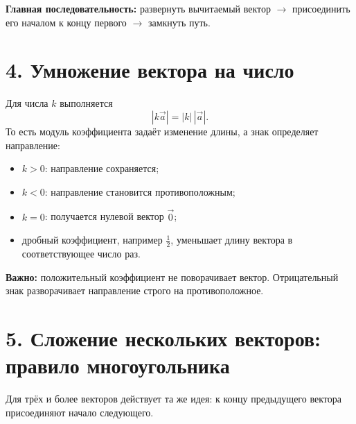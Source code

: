 \documentclass[a4paper,12pt]{article}
\newcommand{\key}[1]{\textbf{\color{darkaccent}#1}}
\newcommand{\mistake}[1]{\textbf{\color{warn}#1}}
\begin{document}
\key{Главная последовательность:} развернуть вычитаемый вектор $\to$ присоединить его началом к концу первого $\to$ замкнуть путь.

\clearpage
\section*{4. Умножение вектора на число}
Для числа $k$ выполняется
\[
|k\vec a|=|k|\,|\vec a|.
\]
То есть модуль коэффициента задаёт изменение длины, а знак определяет направление:

\begin{itemize}
  \item $k>0$: направление сохраняется;
  \item $k<0$: направление становится противоположным;
  \item $k=0$: получается нулевой вектор $\vec 0$;
  \item дробный коэффициент, например $\frac12$, уменьшает длину вектора в соответствующее число раз.
\end{itemize}

\begin{center}
\end{center}

\mistake{Важно:} положительный коэффициент не поворачивает вектор. Отрицательный знак разворачивает направление строго на противоположное.

\section*{5. Сложение нескольких векторов: правило многоугольника}
Для трёх и более векторов действует та же идея: к концу предыдущего вектора присоединяют начало следующего.

\begin{center}
\end{center}
\end{document}
